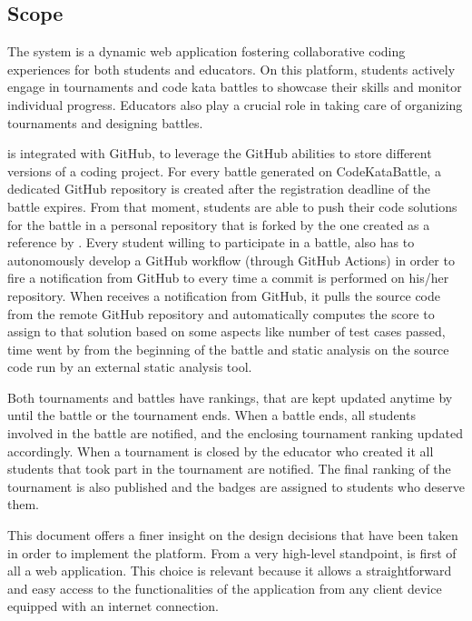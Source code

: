 \subsection{Scope}
The \app system is a dynamic web application fostering collaborative coding experiences for both students and educators. On this platform, students actively engage in tournaments and code kata battles to showcase their skills and monitor individual progress. 
Educators also play a crucial role in taking care of organizing tournaments and designing battles.

\app is integrated with GitHub, to leverage the GitHub abilities to store different versions of a coding project. For every battle generated on CodeKataBattle, a dedicated GitHub repository is created after the registration deadline of the battle expires. From that moment, students are able to push their code solutions for the battle in a personal repository that is forked by the one created as a reference by \app. 
Every student willing to participate in a battle, also has to autonomously develop a GitHub workflow (through GitHub Actions) in order to fire a notification from GitHub to \app every time a commit is performed on his/her repository.
When \app receives a notification from GitHub, it pulls the source code from the remote GitHub repository and automatically computes the score to assign to that solution based on some aspects like number of test cases passed, time went by from the beginning of the battle and static analysis on the source code run by an external static analysis tool.

Both tournaments and battles have rankings, that are kept updated anytime by \app until the battle or the tournament ends. When a battle ends, all students involved in the battle are notified, and the enclosing tournament ranking updated accordingly. When a tournament is closed by the educator who created it all students that took part in the tournament are notified. The final ranking of the tournament is also published and the badges are assigned to students who deserve them.

This document offers a finer insight on the design decisions that have been taken in order to implement the \app platform. From a very high-level standpoint, \app is first of all a web application. This choice is relevant because it allows a straightforward and easy access to the functionalities of the application from any client device equipped with an internet connection. 

